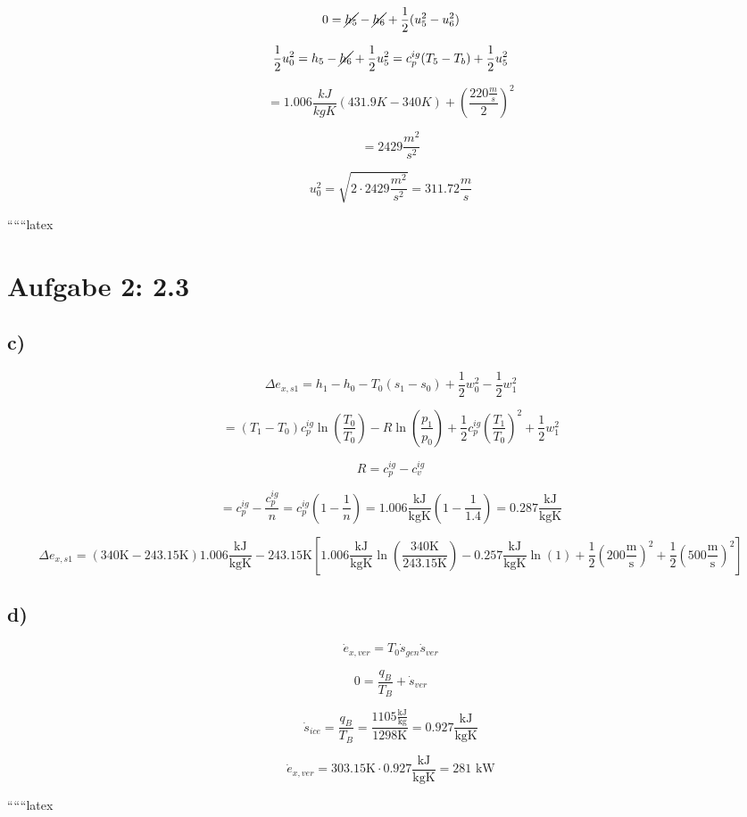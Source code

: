 \[
0 = \cancel{h_5} - \cancel{h_6} + \frac{1}{2} (u_5^2 - u_6^2)
\]

\[
\frac{1}{2} u_0^2 = h_5 - \cancel{h_6} + \frac{1}{2} u_5^2 = c_p^{ig} (T_5 - T_b) + \frac{1}{2} u_5^2
\]

\[
= 1.006 \frac{kJ}{kgK} (431.9K - 340K) + \left( \frac{220 \frac{m}{s}}{2} \right)^2
\]

\[
= 2429 \frac{m^2}{s^2}
\]

\[
u_0^2 = \sqrt{2 \cdot 2429 \frac{m^2}{s^2}} = 311.72 \frac{m}{s}
\]

``````latex


\section*{Aufgabe 2: 2.3}

\subsection*{c)}

\[
\Delta e_{x,s1} = h_1 - h_0 - T_0 (s_1 - s_0) + \frac{1}{2} w_0^2 - \frac{1}{2} w_1^2
\]

\[
= (T_1 - T_0) c_p^{ig} \ln \left( \frac{T_0}{T_0} \right) - R \ln \left( \frac{p_1}{p_0} \right) + \frac{1}{2} c_p^{ig} \left( \frac{T_1}{T_0} \right)^2 + \frac{1}{2} w_1^2
\]

\[
R = c_p^{ig} - c_v^{ig}
\]

\[
= c_p^{ig} - \frac{c_p^{ig}}{n} = c_p^{ig} \left( 1 - \frac{1}{n} \right) = 1.006 \frac{\text{kJ}}{\text{kgK}} \left( 1 - \frac{1}{1.4} \right) = 0.287 \frac{\text{kJ}}{\text{kgK}}
\]

\[
\Delta e_{x,s1} = (340 \text{K} - 243.15 \text{K}) 1.006 \frac{\text{kJ}}{\text{kgK}} - 243.15 \text{K} \left[ 1.006 \frac{\text{kJ}}{\text{kgK}} \ln \left( \frac{340 \text{K}}{243.15 \text{K}} \right) - 0.257 \frac{\text{kJ}}{\text{kgK}} \ln \left( 1 \right) + \frac{1}{2} (200 \frac{\text{m}}{\text{s}})^2 + \frac{1}{2} (500 \frac{\text{m}}{\text{s}})^2 \right]
\]

\subsection*{d)}

\[
\dot{e}_{x,ver} = T_0 \dot{s}_{gen} \dot{s}_{ver}
\]

\[
0 = \frac{q_B}{T_B} + \dot{s}_{ver}
\]

\[
\dot{s}_{ice} = \frac{q_B}{T_B} = \frac{1105 \frac{\text{kJ}}{\text{kg}}}{1298 \text{K}} = 0.927 \frac{\text{kJ}}{\text{kgK}}
\]

\[
\dot{e}_{x,ver} = 303.15 \text{K} \cdot 0.927 \frac{\text{kJ}}{\text{kgK}} = 281 \text{ kW}
\]

``````latex


